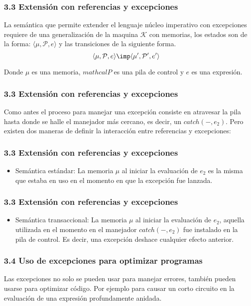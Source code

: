 \documentclass[xcolor=dvipsnames,table,spanish]{beamer}
\begin{document}
\begin{frame}
\frametitle{3.3 Extensión con referencias y excepciones}
La semántica que permite extender el lenguaje núcleo imperativo con excepciones requiere de una generalización de la maquina $\mathcal{K}$ con memorias, los estados son de la forma: $\langle \mu , \mathcal{P} , e \rangle$ y las transiciones de la siguiente forma.
\[\langle \mu , \mathcal{P} , e \rangle \imp \langle \mu ', \mathcal{P}' , e' \rangle\]

Donde $\mu$ es una memoria, $mathcal{P}$ es una pila de control y $e$ es una expresión.
\end{frame}
\begin{frame}
\frametitle{3.3 Extensión con referencias y excepciones}
Como antes el proceso para manejar una excepción consiste en atravesar la pila hasta donde se halle el manejador más cercano, es decir, un $catch(-,e_2)$. Pero existen dos maneras de definir la interacción entre referencias y excepciones:

\end{frame}

\begin{frame}
\frametitle{3.3 Extensión con referencias y excepciones}
\begin{itemize}
\item Semántica estándar: La memoria $\mu$ al iniciar la evaluación de $e_2$ es la misma que estaba en uso en el momento en que la excepción fue lanzada.
\end{itemize}
\end{frame}

\begin{frame}
\frametitle{3.3 Extensión con referencias y excepciones}
\begin{itemize}
\item Semántica transaccional: La memoria $\mu$ al iniciar la evaluación de $e_2$, aquella utilizada en el momento en el manejador $catch(-,e_2)$ fue instalado en la pila de control. Es decir, una excepción deshace cualquier efecto anterior.
\end{itemize}
\end{frame}

\begin{frame}
\frametitle{3.4 Uso de excepciones para optimizar programas}
Las excepciones no solo se pueden usar para manejar errores, también pueden usarse para optimizar código. Por ejemplo para causar un corto circuito en la evaluación de una expresión profundamente anidada.

\end{frame}
\end{document}
